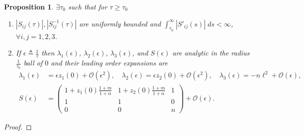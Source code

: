 \documentclass[a4paper,11pt]{article}
\def\l{{\ell}}
\newtheorem{proposition}{Proposition}[section]
\theoremstyle{remark}
\begin{document}
{\begin{proposition}\label{prop:ctsdiag} $\exists \tau_0$ such that for $\tau\ge \tau_0$%
 \begin{enumerate}
  \item $|S_{ij}(\tau)|, |S^{-1}_{ij}(\tau)|$ are uniformly bounded and %
  $\int_{\tau_0}^\infty |{S}'_{ij}(s)|\; ds <\infty$, $\forall i,j=1,2,3$.
  \item If $\epsilon\triangleq \frac{1}{\tau}$ then $\lambda_1(\epsilon)$, $\lambda_2(\epsilon)$, $\lambda_3(\epsilon)$, and $S(\epsilon)$ are analytic in the radius $\frac{1}{\tau_0}$ ball of $0$ and their leading order expansions are
  \begin{align}
   \lambda_1(\epsilon) & = \epsilon z_1(0) + \mathcal{O}(\epsilon^2),\quad %
   \lambda_2(\epsilon) = \epsilon z_2(0) + \mathcal{O}(\epsilon^2),\quad %
   \lambda_3(\epsilon) = -n\l^2 + \mathcal{O}(\epsilon),\\%
   S(\epsilon)
   &=\begin{pmatrix}
    1 + z_1(0)\frac{1+m}{1+\alpha} & 1 + z_2(0)\frac{1+m}{1+\alpha} & 1 \label{eq:S(0)}\\
    1 & 1 & 0\\
    0 & 0 & n
   \end{pmatrix} + \mathcal{O}(\epsilon).%
  \end{align}
 \end{enumerate}
\end{proposition}
\begin{proof}

\end{proof}}
\end{document}
